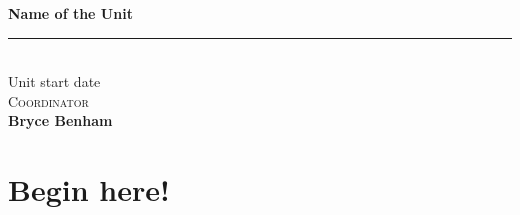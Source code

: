 \documentclass[a4paper,12pt]{article}
\date{}
\newcommand{\unitName}{Name of the Unit}
\newcommand{\unitDate}{Unit start date}
\newcommand{\unitCoordinator}{Coordinator}
\newcommand{\documentAuthor}{Bryce Benham}
\begin{document}
%
\begin{titlepage}
	\begin{center}
		{\Huge \textbf{\unitName}} \\[0.2in]
		\rule{0.7\textwidth}{0.6pt} \\[0.2in]
		{\large \unitDate} \\[0.3in]
		{\large \textsc{\unitCoordinator}} \\[0.2in]
		\vfill
		{\Large \textbf{\documentAuthor}} \\[0.1in]
	\end{center}
	\thispagestyle{empty}
\end{titlepage}
% 
\tableofcontents
\newpage
%
\section{Begin here!}
\end{document}
